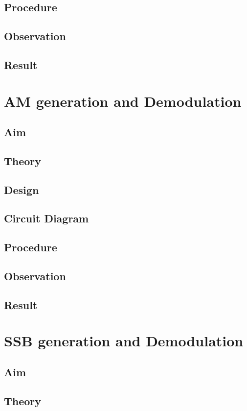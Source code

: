 \documentclass{book}
\begin{document}
\section*{Procedure}
\section*{Observation}
\section*{Result}

\chapter[AM generation and Demodulation]{AM generation and Demodulation}
\section*{Aim}
\section*{Theory}
\section*{Design}
\section*{Circuit Diagram}
\section*{Procedure}
\section*{Observation}
\section*{Result}
\chapter[SSB generation and Demodulation]{SSB generation and Demodulation}
\section*{Aim}
\section*{Theory}
\end{document}
